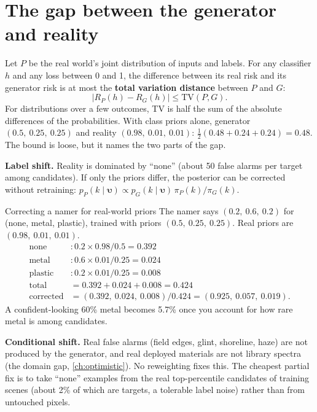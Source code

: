 \documentclass[11pt,a4paper,oneside,openany]{book}
\newcommand{\B}[1]{{\symbf{#1}}}
\newcommand{\B}[1]{{\bm{#1}}}
\newcommand{\vupsilon}{\B{\upsilon}}
\begin{document}
\section{The gap between the generator and reality}

Let $P$ be the real world's joint distribution of inputs and labels. For any classifier $h$ and any loss between 0 and 1, the difference between its real risk and its
generator risk is at most the \textbf{total variation distance} between $P$ and $G$:
\[
  |R_P(h)-R_G(h)|\le\mathrm{TV}(P,G).
\]
For distributions over a few outcomes, TV is half the sum of the absolute differences of the probabilities. With class priors alone, generator $(0.5,\ 0.25,\ 0.25)$
and reality $(0.98,\ 0.01,\ 0.01)$: $\frac12(0.48+0.24+0.24)=0.48$. The bound is loose, but it names the two parts of the gap.

\textbf{Label shift.} Reality is dominated by ``none'' (about 50 false alarms per target among candidates). If only the priors differ, the posterior can be corrected without
retraining: $p_P(k\mid\vupsilon)\propto p_G(k\mid\vupsilon)\,\pi_P(k)/\pi_G(k)$.

\begin{worked}[label=we:labelshift]{Correcting a namer for real-world priors}
The namer says $(0.2,\ 0.6,\ 0.2)$ for (none, metal, plastic), trained with priors $(0.5,\ 0.25,\ 0.25)$. Real priors are $(0.98,\ 0.01,\ 0.01)$.
\begin{align*}
\text{none} &: 0.2\times0.98/0.5=0.392\\
\text{metal} &: 0.6\times0.01/0.25=0.024\\
\text{plastic} &: 0.2\times0.01/0.25=0.008\\
\text{total} &= 0.392+0.024+0.008=0.424\\
\text{corrected} &= (0.392,\ 0.024,\ 0.008)/0.424=(0.925,\ 0.057,\ 0.019).
\end{align*}
A confident-looking 60\% metal becomes 5.7\% once you account for how rare metal is among candidates.
\end{worked}

\textbf{Conditional shift.} Real false alarms (field edges, glint, shoreline, haze) are not produced by the generator, and real deployed materials are not library spectra
(the domain gap, \cref{ch:optimistic}). No reweighting fixes this. The cheapest partial fix is to take ``none'' examples from the real top-percentile candidates of training
scenes (about 2\% of which are targets, a tolerable label noise) rather than from untouched pixels.
\end{document}
